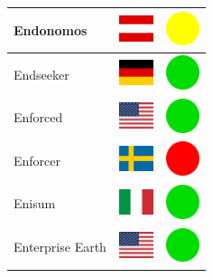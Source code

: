 \documentclass[12pt, a4paper, twoside]{report}
\begin{document}
\begin{center}
\begin{longtable}{|p{5cm}|p{2cm}|p{2cm}|}
 Endonomos                                                  & \includegraphics[width=1cm]{../4x3/at} &   \includegraphics[width=1cm]{../likes/m} \\ \hline
 Endseeker                                                  & \includegraphics[width=1cm]{../4x3/de} &   \includegraphics[width=1cm]{../likes/y} \\ \hline
 Enforced                                                   & \includegraphics[width=1cm]{../4x3/us} &   \includegraphics[width=1cm]{../likes/y} \\ \hline
 Enforcer                                                   & \includegraphics[width=1cm]{../4x3/se} &   \includegraphics[width=1cm]{../likes/n} \\ \hline
 Enisum                                                     & \includegraphics[width=1cm]{../4x3/it} &   \includegraphics[width=1cm]{../likes/y} \\ \hline
 Enterprise Earth                                           & \includegraphics[width=1cm]{../4x3/us} &   \includegraphics[width=1cm]{../likes/y} \\ \hline

\end{longtable}
\end{center}
\end{document}
